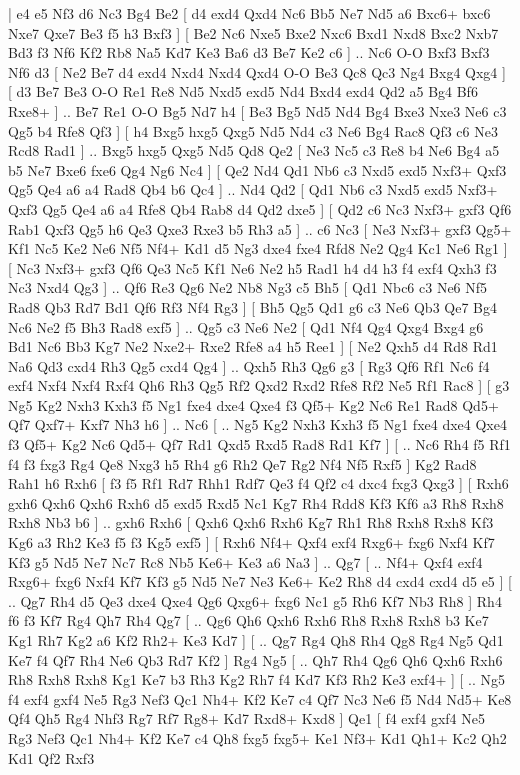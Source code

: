 \makegametitle 
|   e4   e5    Nf3   d6    Nc3   Bg4    Be2 [  d4 exd4  Qxd4 Nc6  Bb5 Ne7  Nd5 a6  Bxc6+ bxc6  Nxe7 Qxe7  Be3 f5  h3 Bxf3   ]  [  Be2 Nc6  Nxe5 Bxe2  Nxc6 Bxd1  Nxd8 Bxc2  Nxb7 Bd3  f3 Nf6  Kf2 Rb8  Na5 Kd7  Ke3 Ba6  d3 Be7  Ke2 c6   ] .. Nc6    O-O   Bxf3    Bxf3   Nf6    d3 [  Ne2 Be7  d4 exd4  Nxd4 Nxd4  Qxd4 O-O  Be3 Qc8  Qc3 Ng4  Bxg4 Qxg4   ]  [  d3 Be7  Be3 O-O  Re1 Re8  Nd5 Nxd5  exd5 Nd4  Bxd4 exd4  Qd2 a5  Bg4 Bf6  Rxe8+   ] .. Be7    Re1   O-O    Bg5   Nd7    h4 [  Be3 Bg5  Nd5 Nd4  Bg4 Bxe3  Nxe3 Ne6  c3 Qg5  b4 Rfe8  Qf3   ]  [  h4 Bxg5  hxg5 Qxg5  Nd5 Nd4  c3 Ne6  Bg4 Rac8  Qf3 c6  Ne3 Rcd8  Rad1   ] .. Bxg5    hxg5   Qxg5    Nd5   Qd8    Qe2 [  Ne3 Nc5  c3 Re8  b4 Ne6  Bg4 a5  b5 Ne7  Bxe6 fxe6  Qg4 Ng6  Nc4   ]  [  Qe2 Nd4  Qd1 Nb6  c3 Nxd5  exd5 Nxf3+  Qxf3 Qg5  Qe4 a6  a4 Rad8  Qb4 b6  Qc4   ] .. Nd4    Qd2 [  Qd1 Nb6  c3 Nxd5  exd5 Nxf3+  Qxf3 Qg5  Qe4 a6  a4 Rfe8  Qb4 Rab8  d4 Qd2  dxe5   ]  [  Qd2 c6  Nc3 Nxf3+  gxf3 Qf6  Rab1 Qxf3  Qg5 h6  Qe3 Qxe3  Rxe3 b5  Rh3 a5   ] .. c6    Nc3 [  Ne3 Nxf3+  gxf3 Qg5+  Kf1 Nc5  Ke2 Ne6  Nf5 Nf4+  Kd1 d5  Ng3 dxe4  fxe4 Rfd8  Ne2 Qg4  Kc1 Ne6  Rg1   ]  [  Nc3 Nxf3+  gxf3 Qf6  Qe3 Nc5  Kf1 Ne6  Ne2 h5  Rad1 h4  d4 h3  f4 exf4  Qxh3 f3  Nc3 Nxd4  Qg3   ] .. Qf6    Re3   Qg6    Ne2   Nb8    Ng3   c5    Bh5 [  Qd1 Nbc6  c3 Ne6  Nf5 Rad8  Qb3 Rd7  Bd1 Qf6  Rf3 Nf4  Rg3   ]  [  Bh5 Qg5  Qd1 g6  c3 Ne6  Qb3 Qe7  Bg4 Nc6  Ne2 f5  Bh3 Rad8  exf5   ] .. Qg5    c3   Ne6    Ne2 [  Qd1 Nf4  Qg4 Qxg4  Bxg4 g6  Bd1 Nc6  Bb3 Kg7  Ne2 Nxe2+  Rxe2 Rfe8  a4 h5  Ree1   ]  [  Ne2 Qxh5  d4 Rd8  Rd1 Na6  Qd3 cxd4  Rh3 Qg5  cxd4 Qg4   ] .. Qxh5    Rh3   Qg6    g3 [  Rg3 Qf6  Rf1 Nc6  f4 exf4  Nxf4 Nxf4  Rxf4 Qh6  Rh3 Qg5  Rf2 Qxd2  Rxd2 Rfe8  Rf2 Ne5  Rf1 Rac8   ]  [  g3 Ng5  Kg2 Nxh3  Kxh3 f5  Ng1 fxe4  dxe4 Qxe4  f3 Qf5+  Kg2 Nc6  Re1 Rad8  Qd5+ Qf7  Qxf7+ Kxf7  Nh3 h6   ] .. Nc6 [ .. Ng5  Kg2 Nxh3  Kxh3 f5  Ng1 fxe4  dxe4 Qxe4  f3 Qf5+  Kg2 Nc6  Qd5+ Qf7  Rd1 Qxd5  Rxd5 Rad8  Rd1 Kf7   ]  [ .. Nc6  Rh4 f5  Rf1 f4  f3 fxg3  Rg4 Qe8  Nxg3 h5  Rh4 g6  Rh2 Qe7  Rg2 Nf4  Nf5 Rxf5   ]  Kg2   Rad8    Rah1   h6    Rxh6 [  f3 f5  Rf1 Rd7  Rhh1 Rdf7  Qe3 f4  Qf2 c4  dxc4 fxg3  Qxg3   ]  [  Rxh6 gxh6  Qxh6 Qxh6  Rxh6 d5  exd5 Rxd5  Nc1 Kg7  Rh4 Rdd8  Kf3 Kf6  a3 Rh8  Rxh8 Rxh8  Nb3 b6   ] .. gxh6    Rxh6 [  Qxh6 Qxh6  Rxh6 Kg7  Rh1 Rh8  Rxh8 Rxh8  Kf3 Kg6  a3 Rh2  Ke3 f5  f3 Kg5  exf5   ]  [  Rxh6 Nf4+  Qxf4 exf4  Rxg6+ fxg6  Nxf4 Kf7  Kf3 g5  Nd5 Ne7  Nc7 Rc8  Nb5 Ke6+  Ke3 a6  Na3   ] .. Qg7 [ .. Nf4+  Qxf4 exf4  Rxg6+ fxg6  Nxf4 Kf7  Kf3 g5  Nd5 Ne7  Ne3 Ke6+  Ke2 Rh8  d4 cxd4  cxd4 d5  e5   ]  [ .. Qg7  Rh4 d5  Qe3 dxe4  Qxe4 Qg6  Qxg6+ fxg6  Nc1 g5  Rh6 Kf7  Nb3 Rh8   ]  Rh4   f6    f3   Kf7    Rg4   Qh7    Rh4   Qg7 [ .. Qg6  Qh6 Qxh6  Rxh6 Rh8  Rxh8 Rxh8  b3 Ke7  Kg1 Rh7  Kg2 a6  Kf2 Rh2+  Ke3 Kd7   ]  [ .. Qg7  Rg4 Qh8  Rh4 Qg8  Rg4 Ng5  Qd1 Ke7  f4 Qf7  Rh4 Ne6  Qb3 Rd7  Kf2   ]  Rg4   Ng5 [ .. Qh7  Rh4 Qg6  Qh6 Qxh6  Rxh6 Rh8  Rxh8 Rxh8  Kg1 Ke7  b3 Rh3  Kg2 Rh7  f4 Kd7  Kf3 Rh2  Ke3 exf4+   ]  [ .. Ng5  f4 exf4  gxf4 Ne5  Rg3 Nef3  Qc1 Nh4+  Kf2 Ke7  c4 Qf7  Nc3 Ne6  f5 Nd4  Nd5+ Ke8  Qf4 Qh5  Rg4 Nhf3  Rg7 Rf7  Rg8+ Kd7  Rxd8+ Kxd8   ]  Qe1 [  f4 exf4  gxf4 Ne5  Rg3 Nef3  Qc1 Nh4+  Kf2 Ke7  c4 Qh8  fxg5 fxg5+  Ke1 Nf3+  Kd1 Qh1+  Kc2 Qh2  Kd1 Qf2  Rxf3 